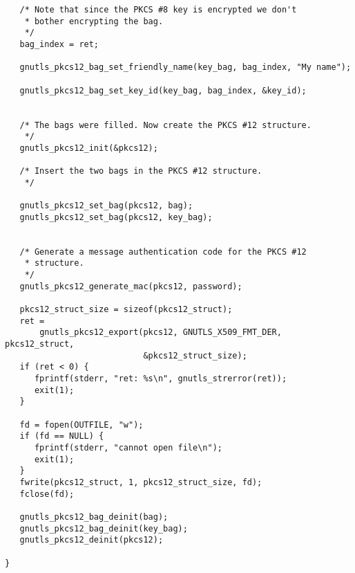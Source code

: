 \begin{verbatim}
   /* Note that since the PKCS #8 key is encrypted we don't
    * bother encrypting the bag.
    */
   bag_index = ret;

   gnutls_pkcs12_bag_set_friendly_name(key_bag, bag_index, "My name");

   gnutls_pkcs12_bag_set_key_id(key_bag, bag_index, &key_id);


   /* The bags were filled. Now create the PKCS #12 structure.
    */
   gnutls_pkcs12_init(&pkcs12);

   /* Insert the two bags in the PKCS #12 structure.
    */

   gnutls_pkcs12_set_bag(pkcs12, bag);
   gnutls_pkcs12_set_bag(pkcs12, key_bag);


   /* Generate a message authentication code for the PKCS #12
    * structure.
    */
   gnutls_pkcs12_generate_mac(pkcs12, password);

   pkcs12_struct_size = sizeof(pkcs12_struct);
   ret =
       gnutls_pkcs12_export(pkcs12, GNUTLS_X509_FMT_DER, pkcs12_struct,
                            &pkcs12_struct_size);
   if (ret < 0) {
      fprintf(stderr, "ret: %s\n", gnutls_strerror(ret));
      exit(1);
   }

   fd = fopen(OUTFILE, "w");
   if (fd == NULL) {
      fprintf(stderr, "cannot open file\n");
      exit(1);
   }
   fwrite(pkcs12_struct, 1, pkcs12_struct_size, fd);
   fclose(fd);

   gnutls_pkcs12_bag_deinit(bag);
   gnutls_pkcs12_bag_deinit(key_bag);
   gnutls_pkcs12_deinit(pkcs12);

}

\end{verbatim}
